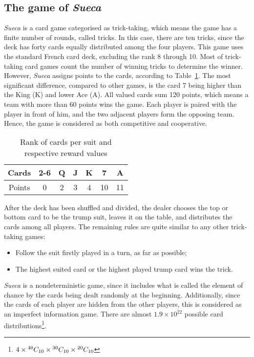 \subsection{The game of \emph{Sueca}}

\emph{Sueca} is a card game categorised as trick-taking, which means the game has a finite number of rounds, called tricks.
In this case, there are ten tricks, since the deck has forty cards equally distributed among the four players.
This game uses the standard French card deck, excluding the rank 8 through 10.
Most of trick-taking card games count the number of winning tricks to determine the winner.
However, \emph{Sueca} assigns points to the cards, according to Table~\ref{tab:points-table}.
The most significant difference, compared to other games, is the card 7 being higher than the King (K) and lower Ace (A).
All valued cards sum 120 points, which means a team with more than 60 points wins the game.
Each player is paired with the player in front of him, and the two adjacent players form the opposing team.
Hence, the game is considered as both competitive and cooperative.

\begin{table}[ht]
\centering
\label{tab:points-table}
\caption{Rank of cards per suit and respective reward values}
\begin{tabular}{|c|c|c|c|c|c|c|}
\hline
Cards  & 2-6 & Q & J & K & 7  & A  \\ \hline
Points & 0   & 2 & 3 & 4 & 10 & 11 \\ \hline
\end{tabular}
\end{table}

After the deck has been shuffled and divided, the dealer chooses the top or bottom card to be the trump suit, leaves it on the table, and distributes the cards among all players.
The remaining rules are quite similar to any other trick-taking games:
\begin{itemize}
\item Follow the suit firstly played in a turn, as far as possible;
\item The highest suited card or the highest played trump card wins the trick.
\end{itemize}


\emph{Sueca} is a nondeterministic game, since it includes what is called the element of chance by the cards being dealt randomly at the beginning.
Additionally, since the cards of each player are hidden from the other players, this is considered as an imperfect information game.
There are almost $1.9\times10^{22}$ possible card distributions\footnote{$4\times{}^{40}C_{10}\times{}^{30}C_{10}\times{}^{20}C_{10}$}.
